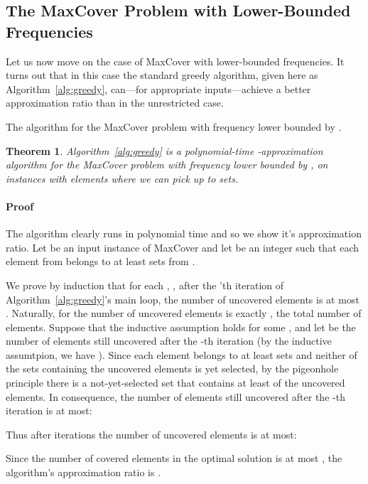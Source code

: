\documentclass[11pt]{article}
\newtheorem{theorem}{Theorem}
\newenvironment{proof}{\paragraph{Proof}}{\hfill\medskip}
\begin{document}
\subsection{The MaxCover Problem with Lower-Bounded Frequencies}

Let us now move on the case of MaxCover with lower-bounded
frequencies.  It turns out that in this case the standard greedy
algorithm, given here as Algorithm~\ref{alg:greedy}, can---for
appropriate inputs---achieve a better approximation ratio than in the
unrestricted case.



\begin{algorithm}[t]
   \small
   \SetAlCapFnt{\small}
   \vspace{3mm}

   \;
   \For{ \KwTo }{
       \;
       \;
      
   }
   \caption{\small The algorithm  for the MaxCover problem with frequency lower bounded by .}
   \label{alg:greedy}
\end{algorithm}

\begin{theorem}\label{theorem:greedy}
  Algorithm~\ref{alg:greedy} is a polynomial-time -approximation algorithm 
  for the MaxCover problem with frequency lower bounded by ,
  on instances with  elements where we can pick up to  sets.
\end{theorem}
\begin{proof}
  The algorithm clearly runs in polynomial time and so we show it's
  approximation ratio. Let  be an input instance of
  MaxCover and let  be an integer such that each element from 
  belongs to at least  sets from .
  
  We prove by induction that for each , , after
  the 'th iteration of Algorithm~\ref{alg:greedy}'s main loop, the
  number of uncovered elements is at most . Naturally, for  the number of uncovered
  elements is exactly , the total number of elements.  Suppose that
  the inductive assumption holds for some ,  and
  let  be the number of elements still uncovered after the
  -th iteration (by the inductive assumtpion, we have ). Since each element belongs to at least
   sets and neither of the sets containing the uncovered elements
  is yet selected, by the pigeonhole principle there is a
  not-yet-selected set that contains at least  of the uncovered elements.  In consequence, the number of
  elements still uncovered after the -th iteration is at most:
  
  Thus after  iterations the number of uncovered elements is at
  most:
  
  Since the number of covered elements in the optimal solution is at
  most , the algorithm's approximation ratio is .~
\end{proof}
\end{document}
